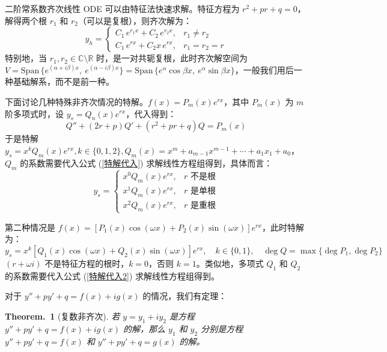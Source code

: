 \documentclass[UTF8]{report}
\def\R{\mathbb{R}}
\def\C{\mathbb{C}}
\theoremstyle{MyLineTheoremStyle} %
\newtheorem{LineTheorem}{Theorem.\,}
\theoremstyle{MyBlockTheoremStyle} %
\theoremstyle{MySubsubsectionStyle} %
\begin{document}
二阶常系数齐次线性 ODE 可以由特征法快速求解。特征方程为 $r^2 + pr + q = 0$，解得两个根 $r_1$ 和 $r_2$（可以是复根），则齐次解为：
\begin{equation}
y_h = \begin{cases}
    C_1\, e^{r_1 x} + C_2\, e^{r_2 x}, & r_1 \neq r_2 \\
    C_1\, e^{r x} + C_2 x\, e^{r x}, & r_1 = r_2 = r
\end{cases}
\end{equation}
特别地，当 $r_1, r_2 \in \C \setminus \R$ 时，是一对共轭复根，此时齐次解空间为 $V = \text{Span}\, \{ e^{(\alpha + i\beta )x},\ e^{(\alpha - i\beta )x} \} = \text{Span}\, \{ e^{\alpha}\cos \beta x,\ e^{\alpha}\sin \beta x \}$，一般我们用后一种基础解系，而不是前一种。

下面讨论几种特殊非齐次情况的特解。$f(x) = P_m(x)e^{rx}$，其中 $P_m(x)$ 为 $m$ 阶多项式时，设 $y_s = Q_n(x)e^{rx}$，代入得到：
\begin{equation}\label{特解代入}
Q'' + (2r + p)Q' + (r^2 + pr + q)Q = P_m(x)
\end{equation}
于是特解 $y_s = x^k Q_m(x)e^{rx}, k \in \{0, 1, 2\}, Q_m(x) = x^m +a_{m-1}x^{m-1} + \cdots + a_1x_1 + a_0$，$Q_m$ 的系数需要代入公式 (\ref{特解代入}) 求解线性方程组得到，具体而言：
\begin{equation}
y_s = \begin{cases}
    x^0 Q_m(x)e^{rx}, & r \text{ 不是根} \\
    x^1 Q_m(x)e^{rx}, & r \text{ 是单根} \\
    x^2 Q_m(x)e^{rx}, & r \text{ 是重根}
\end{cases}
\end{equation}


第二种情况是 $f(x) = \left[ P_1(x)\cos (\omega x) + P_2(x) \sin (\omega x) \right]e^{rx}$，此时特解为：
\begin{equation}\label{特解代入2}
y_s = x^k \left[ Q_1(x)\cos (\omega x) + Q_2(x) \sin (\omega x) \right]e^{rx},\quad k \in \{0, 1\},\quad \deg Q = \max \{\deg P_1, \deg P_2\}
\end{equation}
$(r + \omega i)$ 不是特征方程的根时，$k = 0$，否则 $k = 1$。类似地，多项式 $Q_1$ 和 $Q_2$ 的系数需要代入公式 (\ref{特解代入2}) 求解线性方程组得到。

对于 $y'' + py' + q = f(x) + ig(x) $ 的情况，我们有定理：
\begin{LineTheorem}[复数非齐次]\label{复数非齐次}
若 $y = y_1 + iy_2$ 是方程 $y'' + py' + q = f(x) + ig(x)$ 的解，那么 $y_1$ 和 $y_2$ 分别是方程 $y'' + py' + q = f(x)$ 和 $y'' + py' + q = g(x)$ 的解。
\end{LineTheorem}
\end{document}
